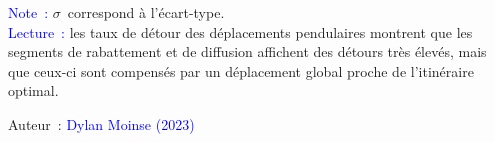     \begin{table}[h!]
    \centering
    \renewcommand{\arraystretch}{1.5}
    \caption{Taux de détour des déplacements pendulaires, impliquant un détour.}
    \label{table-chap5:taux-detours}
        \vspace{5pt}
        \begin{flushleft}\scriptsize{
        \textcolor{blue}{Note~:} $\sigma$~correspond à l'écart-type.
        \\
        \textcolor{blue}{Lecture~:} les taux de détour des déplacements pendulaires montrent que les segments de rabattement et de diffusion affichent des détours très élevés, mais que ceux-ci sont compensés par un déplacement global proche de l'itinéraire optimal.
        }\end{flushleft}
        \begin{flushright}\scriptsize{
        Auteur~: \textcolor{blue}{Dylan Moinse (2023)}
        }\end{flushright}
        \end{table}